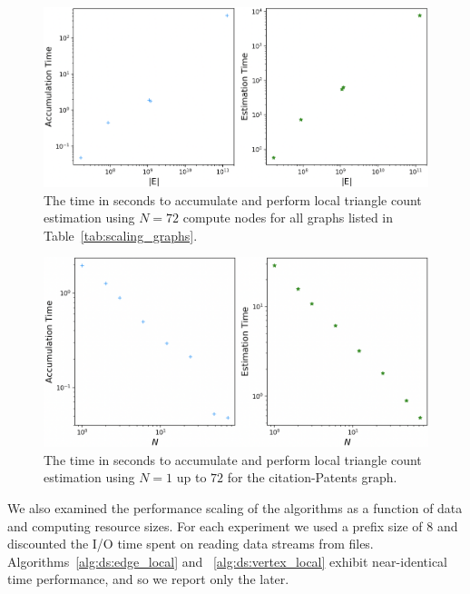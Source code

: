 \documentclass{vldb}
\begin{document}
\begin{figure}
\centering
\includegraphics[width=1.0\columnwidth]{ds_scaling}
\caption{The time in seconds to accumulate and perform local triangle count estimation using $N=72$ compute nodes for all graphs listed in Table~\ref{tab:scaling_graphs}.
}
\label{fig:strong_scaling}
\end{figure}


\begin{figure}
\centering
\includegraphics[width=1.0\columnwidth]{patents_scaling}
\caption{The time in seconds to accumulate and perform local triangle count estimation using $N=1$ up to $72$ for the citation-Patents graph. 
}
\label{fig:weak_scaling}
\end{figure}



We also examined the performance scaling of the algorithms as a function of data and computing resource sizes.
For each experiment we used a prefix size of 8 and discounted the I/O time spent on reading data streams from files.
Algorithms~\ref{alg:ds:edge_local} and ~\ref{alg:ds:vertex_local} exhibit near-identical time performance, and so we report only the later.
\end{document}
